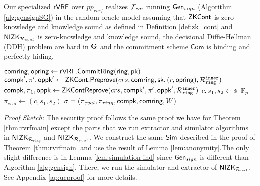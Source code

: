 \begin{theorem}\label{thm:rvrfspecial}
	Our specialized $ {\mathsf{rVRF}} $   over  $ pp_{rvrf} $ realizes $ \mathcal{F}_{\textsf{rvrf}} $ running $ \mathsf{Gen}_{sign} $ (Algorithm \ref{alg:gensignSG}) \cite{canetti1,canetti2} in the random oracle model assuming that ${\mathsf{ZKCont}} $ is zero-knowledge and knowledge sound as defined in Definition \ref{def:zk_cont} and $ {\mathsf{NIZK}}_{\mathcal{R}_{eval}} $ is zero-knowledge and knowledge sound, the decisional Diffie-Hellman (DDH) problem are hard in $ {\mathbf{G}}  $  and the commitment scheme $ \mathsf{Com} $ is binding and perfectly hiding. 
\end{theorem}
\begin{algorithm}
	\eprint{}{\scriptsize}
	\caption{$\Gen_{sign}(\ring,W,x = (\sk,r),\pk,\aux,\msg)$}
	\label{alg:gensignSG}	 	
	\begin{algorithmic}[1]
		\State $ \mathsf{comring}, \mathsf{opring} \leftarrow {\ensuremath{\mathsf{rVRF}}}.{\mathsf{CommitRing}}(\mathsf{ring}, \mathsf{pk}) $
		\State $ \mathsf{compk}', \pi', \mathsf{oppk}' \leftarrow {\ensuremath{\mathsf{ZKCont}}}.{\mathsf{Preprove}}(crs, \mathsf{comring},\mathsf{sk},(r,\mathsf{opring}),\mathcal{R}_{\mathtt{ring}}^{\mathtt{inner}}) $
		\State $ \mathsf{compk}, \pi_1, \mathsf{oppk} \leftarrow {\ensuremath{\mathsf{ZKCont}}}{\ensuremath{\mathsf{Reprove}}}(crs, \mathsf{compk}',\pi',\mathsf{oppk}',\mathcal{R}_{\mathtt{ring}}^{\mathtt{inner}}) $ 
		\State $ c,s_1, s_2 \leftsample \F_p $
		\State $ \pi_{eval}  \leftarrow (c,s_1, s_2)$		
		\State\Return$ \sigma = (\pi_{eval},\pi_{ring},\mathsf{compk},\mathsf{comring},W) $
	\end{algorithmic}
	
\end{algorithm}

\noindent \textit{Proof Sketch:}  The security proof follows the same proof we have for Theorem \ref{thm:rvrfmain} except the parts that we run extractor and simulator algorithms in $ {\mathsf{NIZK}}_{\mathcal{R}_{\mathtt{ring}}} $ and $ {\mathsf{NIZK}}_{\mathcal{R}_{eval}} $.
We construct the same $ \mathsf{Sim} $ described in the proof of Theorem \ref{thm:rvrfmain} and use the result of Lemma \ref{lem:anonymity}.The only slight difference is in Lemma \ref{lem:simulation-ind} since $ \mathsf{Gen}_{sign} $ is different than Algorithm \ref{alg:gensign}. There, we run the simulator and extractor of $ {\mathsf{NIZK}}_{\mathcal{R}_{\mathtt{rvrf}}} $. See Appendix \ref{ap:ucproof} for more details.




